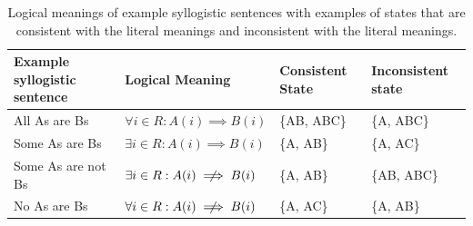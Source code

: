 \documentclass[floatsintext, doc]{apa6}
\begin{document}


\begin{table}[]
\begin{tabular}{@{}llll@{}}
\toprule
Example syllogistic sentence & Logical Meaning                                                                       & Consistent State & Inconsistent state \\ \midrule
All As are Bs                                      & $\forall i \in R: A(i) \implies B(i) $ & \{AB, ABC\}                           & \{A, ABC\}                              \\
Some As are Bs                                     & $\exists i \in R: A(i) \implies B(i) $ & \{A, AB\}                             & \{A, AC\}                               \\
Some As are not Bs                                 & $\exists i \in R: A(i)  \centernot \implies B(i) $ & \{A, AB\}                             & \{AB, ABC\}                             \\
No As are Bs                                       & $\forall i \in R: A(i) \centernot \implies B(i) $  & \{A, AC\}                             & \{A, AB\} \\ \bottomrule
\end{tabular}
\caption{Logical meanings of example syllogistic sentences with examples of states that are consistent with the literal meanings and inconsistent with the literal meanings.}
\label{tab:sem}
\end{table}
\end{document}
